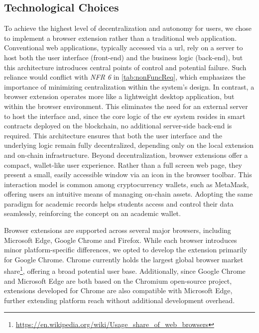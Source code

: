 \subsection{Technological Choices}
To achieve the highest level of decentralization and autonomy for users, we chose to implement a browser extension rather than a traditional web application. Conventional web applications, typically accessed via a \acrshort{url}, rely on a server to host both the user interface (front-end) and the business logic (back-end), but this architecture introduces central points of control and potential failure. Such reliance would conflict with \textit{NFR 6} in \cref{tab:nonFuncReq}, which emphasizes the importance of minimizing centralization within the system's design.
In contrast, a browser extension operates more like a lightweight desktop application, but within the browser environment. This eliminates the need for an external server to host the interface and, since the core logic of the \acrlong{ew} system resides in smart contracts deployed on the blockchain, no additional server-side back-end is required. This architecture ensures that both the user interface and the underlying logic remain fully decentralized, depending only on the local extension and on-chain infrastructure.
Beyond decentralization, browser extensions offer a compact, wallet-like user experience. Rather than a full screen web page, they present a small, easily accessible window via an icon in the browser toolbar. This interaction model is common among cryptocurrency wallets, such as MetaMask, offering users an intuitive means of managing on-chain assets. Adopting the same paradigm for academic records helps students access and control their data seamlessly, reinforcing the concept on an academic wallet.

Browser extensions are supported across several major browsers, including Microsoft Edge, Google Chrome and Firefox. While each browser introduces minor platform-specific differences, we opted to develop the extension primarily for Google Chrome. Chrome currently holds the largest global browser market share\footnote{\url{https://en.wikipedia.org/wiki/Usage_share_of_web_browsers}}, offering a broad potential user base. Additionally, since Google Chrome and Microsoft Edge are both based on the Chromium open-source project, extensions developed for Chrome are also compatible with Microsoft Edge, further extending platform reach without additional development overhead.

